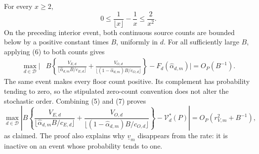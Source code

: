 For every \(x\ge2\),
\[
 0\le\frac1{\lfloor x\rfloor}-\frac1x
 \le\frac2{x^2}. \tag{6}
\]
On the preceding interior event, both continuous source counts are bounded below by a positive constant times \(B\), uniformly in \(d\).  For all sufficiently large \(B\), applying (6) to both counts gives
\[
\begin{aligned}
 \max_{d\in\mathcal D}\Bigg|&B\left\{
 \frac{V_{E,d}}{\lfloor\widehat\alpha_{d,m}B/c_{E,d}\rfloor}
 +\frac{V_{O,d}}{\lfloor(1-\widehat\alpha_{d,m})B/c_{O,d}\rfloor}
 \right\}
 -F_d(\widehat\alpha_{d,m})\Bigg|
 =O_P(B^{-1}).
\end{aligned} \tag{7}
\]
The same event makes every floor count positive.  Its complement has probability tending to zero, so the stipulated zero-count convention does not alter the stochastic order.  Combining (5) and (7) proves
\[
\max_{d\in\mathcal D}\left|B\left\{
\frac{V_{E,d}}{\lfloor\widehat\alpha_{d,m}B/c_{E,d}\rfloor}
+\frac{V_{O,d}}{\lfloor(1-\widehat\alpha_{d,m})B/c_{O,d}\rfloor}
\right\}-\mathcal V_d^*(P)\right|
=O_P(r_{V,m}^2+B^{-1}),
\]
as claimed.  The proof also explains why \(\underline v_m\) disappears from the rate: it is inactive on an event whose probability tends to one.
